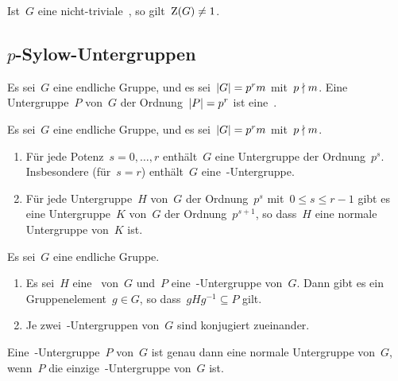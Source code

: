 \begin{corollary}
  Ist~$G$ eine nicht-triviale~, so gilt~$\operatorname{Z}(G) \neq 1$.
\end{corollary}



\subsection{\texorpdfstring{$p$}{p}-Sylow-Untergruppen}

\begin{definition}
  Es sei~$G$ eine endliche Gruppe, und es sei~$\lvert G\rvert = p^r m$ mit~$p \nmid m$.
  Eine Untergruppe~$P$ von~$G$ der Ordnung~$\lvert P\rvert = p^r$ ist eine~.
\end{definition}

\begin{theorem}
  Es sei~$G$ eine endliche Gruppe, und es sei~$\lvert G\rvert = p^r m$ mit~$p \nmid m$.
  \begin{enumerate}
    \item
      Für jede Potenz~$s = 0, \dotsc, r$ enthält~$G$ eine Untergruppe der Ordnung~$p^s$.
      Insbesondere (für~$s = r$) enthält~$G$ eine~-Untergruppe.
    \item
      Für jede Untergruppe~$H$ von~$G$ der Ordnung~$p^s$ mit~$0 \leq s \leq r-1$ gibt es eine Untergruppe~$K$ von~$G$ der Ordnung~$p^{s+1}$, so dass~$H$ eine normale Untergruppe von~$K$ ist.
  \end{enumerate}
\end{theorem}

\begin{theorem}
  Es sei~$G$ eine endliche Gruppe.
  \begin{enumerate}
    \item
      Es sei~$H$ eine~ von~$G$ und~$P$ eine~-Untergruppe von~$G$.
      Dann gibt es ein Gruppenelement~$g \in G$, so dass~$g H g^{-1} \subseteq P$ gilt.
    \item
      Je zwei~-Untergruppen von~$G$ sind konjugiert zueinander.
  \end{enumerate}
\end{theorem}

\begin{corollary}
  Eine~-Untergruppe~$P$ von~$G$ ist genau dann eine normale Untergruppe von~$G$, wenn~$P$ die einzige~-Untergruppe von~$G$ ist.
\end{corollary}

